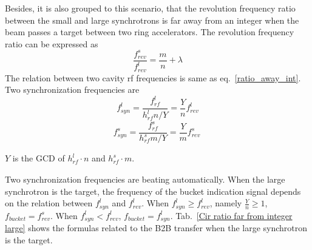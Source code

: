 %
%




Besides, it is also grouped to this scenario, that the revolution frequency ratio between the small and large synchrotrons is far away from an integer when the beam passes a target between two ring accelerators. The revolution frequency ratio can be expressed as
\begin{equation} 
\frac{f_{\mathit{rev}}^{s}}{f_{\mathit{rev}}^{l}}=\frac{m}{n}+ \lambda\label{close_to_interger2}
\end{equation}
The relation between two cavity rf frequencies is same as eq.~\ref{ratio_away_int}. Two synchronization frequencies are
\begin{equation}
f_{\mathit{syn}}^{l}=\frac{f_{\mathit{rf}}^{l}}{h^l_\mathit{rf}n/Y}=\frac{Y}{n}f_{\mathit{rev}}^{l} \label{synch_freq111_r}
\end{equation}
\begin{equation}
f_{\mathit{syn}}^{s}=\frac{f_{\mathit{rf}}^{s}}{h^s_\mathit{rf}m/Y}=\frac{Y}{m}f_{\mathit{rev}}^{s} \ \label{synch_freq222_r}
\end{equation}

$Y$ is the GCD of $h^l_\mathit{rf}\cdot n$ and $h^s_\mathit{rf} \cdot m$.

Two synchronization frequencies are beating automatically. When the large synchrotron is the target, the frequency of the bucket indication signal depends on the relation between $f_{\mathit{syn}}^{l}$ and $f_{\mathit{rev}}^{l}$. When $f_{\mathit{syn}}^{l}\ge f_{\mathit{rev}}^{l}$, namely $\frac{Y}{n}\ge1$, $f_\mathit{bucket}=f_{\mathit{rev}}^{s}$. When $f_{\mathit{syn}}^{l}< f_{\mathit{rev}}^{l}$, $f_\mathit{bucket}=f_{\mathit{syn}}^{l}$. Tab.~\ref{Cir ratio far from integer large} shows the formulas related to the B2B transfer when the large synchrotron is the target.

